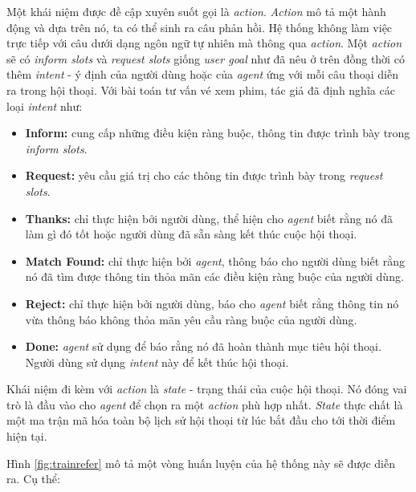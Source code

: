 Một khái niệm được đề cập xuyên suốt gọi là \textit{action}.
\textit{Action} mô tả một hành động và dựa trên nó, ta có thể sinh ra
câu phản hồi. Hệ thống không làm việc trực tiếp với câu dưới dạng
ngôn ngữ tự nhiên mà thông qua \textit{action}. Một \textit{action}
sẽ có \textit{inform slots} và \textit{request slots} giống
\textit{user goal} như đã nêu ở trên đồng thời có thêm
\textit{intent} - ý định của người dùng hoặc của \textit{agent}
ứng với mỗi câu thoại diễn ra trong hội thoại. Với bài toán tư vấn
vé xem phim, tác giả đã định nghĩa các loại \textit{intent} như:

\begin{itemize}
    \item \textbf{Inform:} cung cấp những điều kiện ràng buộc,
    thông tin được trình bày trong \textit{inform slots}.
    \item \textbf{Request:} yêu cầu giá trị cho các thông tin được
    trình bày trong \textit{request slots}.
    \item \textbf{Thanks:} chỉ thực hiện bởi người dùng, thể hiện cho
    \textit{agent} biết rằng nó đã làm gì đó tốt hoặc người dùng đã
    sẵn sàng kết thúc cuộc hội thoại.
    \item \textbf{Match Found:} chỉ thực hiện bởi \textit{agent},
    thông báo cho người dùng biết rằng nó đã tìm được thông tin
    thỏa mãn các điều kiện ràng buộc của người dùng.
    \item \textbf{Reject:} chỉ thực hiện bởi người dùng, báo cho
    \textit{agent} biết rằng thông tin nó vừa thông báo không
    thỏa mãn yêu cầu ràng buộc của người dùng.
    \item \textbf{Done:} \textit{agent} sử dụng để báo rằng nó đã
    hoàn thành mục tiêu hội thoại. Người dùng sử dụng \textit{intent}
    này để kết thúc hội thoại.
\end{itemize}

Khái niệm đi kèm với \textit{action} là \textit{state} - trạng thái
của cuộc hội thoại. Nó đóng vai trò là đầu vào cho \textit{agent} để
chọn ra một \textit{action} phù hợp nhất. \textit{State} thực chất là
một ma trận mã hóa toàn bộ lịch sử hội thoại từ lúc bắt đầu cho tới
thời điểm hiện tại.

Hình \ref{fig:trainrefer} mô tả một vòng huấn luyện của hệ thống này
sẽ được diễn ra. Cụ thể:

